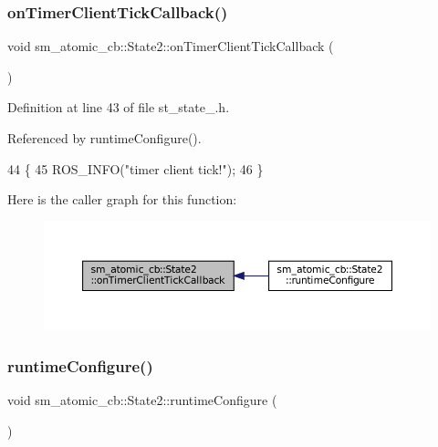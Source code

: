 \subsubsection{\texorpdfstring{on\+Timer\+Client\+Tick\+Callback()}{onTimerClientTickCallback()}}
{\footnotesize\ttfamily void sm\+\_\+atomic\+\_\+cb\+::\+State2\+::on\+Timer\+Client\+Tick\+Callback (\begin{DoxyParamCaption}{ }\end{DoxyParamCaption})\hspace{0.3cm}{\ttfamily [inline]}}



Definition at line 43 of file st\+\_\+state\+\_.\+h.



Referenced by runtime\+Configure().


\begin{DoxyCode}
44     \{
45         ROS\_INFO(\textcolor{stringliteral}{"timer client tick!"});
46     \}
\end{DoxyCode}
Here is the caller graph for this function\+:
\nopagebreak
\begin{figure}[H]
\begin{center}
\leavevmode
\includegraphics[width=350pt]{structsm__atomic__cb_1_1State2_a9367ee51725a8f2e8cdbf7d922cf9108_icgraph}
\end{center}
\end{figure}
\mbox{\label{structsm__atomic__cb_1_1State2_a47560e2531cd7d9ae1ab2da6e7bc47d0}} 
\subsubsection{\texorpdfstring{runtime\+Configure()}{runtimeConfigure()}}
{\footnotesize\ttfamily void sm\+\_\+atomic\+\_\+cb\+::\+State2\+::runtime\+Configure (\begin{DoxyParamCaption}{ }\end{DoxyParamCaption})\hspace{0.3cm}{\ttfamily [inline]}}



